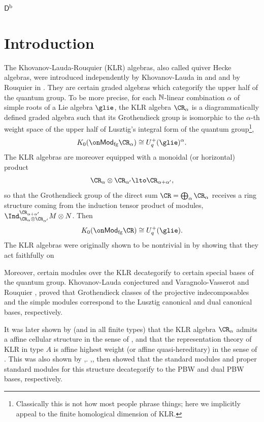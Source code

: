 \documentclass[11pt,reqno]{amsart}
\renewcommand{\te}[1]{\textrm{#1}}
\begin{document}
\textcolor{white}{$\Db$}\vspace{-1em}

\tableofcontents


\section{Introduction}
The Khovanov-Lauda-Rouquier (KLR) algebras, also called quiver Hecke algebras, were introduced independently by Khovanov-Lauda in \cite{KL09} and \cite{KLII} and by Rouquier in \cite{rouquier20082}. They are certain graded algebras which categorify the upper half of the quantum group. To be more precise, for each $\mathbb N$-linear combination $\alpha$ of simple roots of a Lie algebra $\glie$, the KLR algebra $\CR_\alpha$ is a diagrammatically defined graded algebra such that its Grothendieck group is isomorphic to the $\alpha$-th weight space of the upper half of Lusztig's integral form of the quantum group\footnote{Classically this is not how most people phrase things; here we implicitly appeal to the finite homological dimension of KLR. },
\[K_0(\Mod_\te{fg} \CR_\alpha)\cong {{U}}_q^+(\glie)^\alpha.\]
The KLR algebras are moreover equipped with a monoidal (or horizontal) product
\[\CR_\alpha\otimes\CR_{\alpha'}\lto\CR_{\alpha+\alpha'},\] 
so that the Grothendieck group of the direct sum $\CR=\bigoplus_\alpha\CR_\alpha$ receives a ring structure coming from the induction tensor product of modules, $\Ind_{\CR_\alpha\otimes\CR_{\alpha'}}^{\CR_{\alpha+\alpha'}} M\otimes N$. Then
\[K_0(\Mod_\te{fg} \CR)\cong {{U}}_q^+(\glie).\]   The KLR algebras were originally shown to be nontrivial in \cite{KL09} by showing that they act faithfully on 

Moreover, certain modules over the KLR decategorify to certain special bases of the quantum group. Khovanov-Lauda \cite{KL09} conjectured and Varagnolo-Vasserot and Rouquier \cite{varagnolo2011canonical},\cite{rouquier2012quiver} proved that Grothendieck classes of the projective indecomposables and the simple modules correspond to the Lusztig canonical and dual canonical bases, respectively. 

It was later shown by \cite{kleshchev2013affine} (and \cite{kleshchevloubert2015affine} in all finite types) that the KLR algebra $\CR_\alpha$ admits a affine cellular structure in the sense of \cite{koenig2012affine}, and that the representation theory of KLR in type $A$ is affine highest weight (or affine quasi-hereditary) in the sense of \cite{Kleshchev_2015}. This was also shown by \cite{BrundanKleshchevMcNamara_2014},\cite{Kato_2014}. \cite{BrundanKleshchevMcNamara_2014},\cite{Kato_2014},\cite{McNamaraKLRI} then showed that the standard modules and proper standard modules for this structure decategorify to the PBW and dual PBW bases, respectively. 
\end{document}

